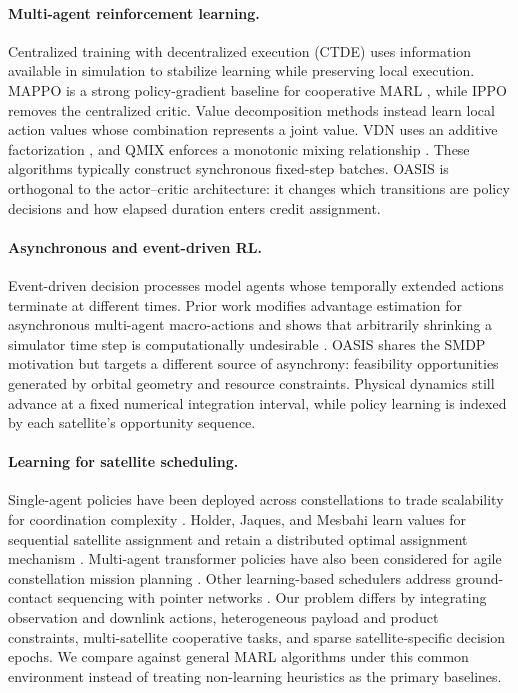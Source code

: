 \documentclass[letterpaper]{article}
\begin{document}
\paragraph{Multi-agent reinforcement learning.}
Centralized training with decentralized execution (CTDE) uses information available in simulation to stabilize learning while preserving local execution.  MAPPO is a strong policy-gradient baseline for cooperative MARL \cite{yu2022mappo}, while IPPO removes the centralized critic.  Value decomposition methods instead learn local action values whose combination represents a joint value.  VDN uses an additive factorization \cite{sunehag2018vdn}, and QMIX enforces a monotonic mixing relationship \cite{rashid2018qmix}.  These algorithms typically construct synchronous fixed-step batches.  OASIS is orthogonal to the actor--critic architecture: it changes which transitions are policy decisions and how elapsed duration enters credit assignment.

\paragraph{Asynchronous and event-driven RL.}
Event-driven decision processes model agents whose temporally extended actions terminate at different times.  Prior work modifies advantage estimation for asynchronous multi-agent macro-actions and shows that arbitrarily shrinking a simulator time step is computationally undesirable \cite{menda2019event}.  OASIS shares the SMDP motivation but targets a different source of asynchrony: feasibility opportunities generated by orbital geometry and resource constraints.  Physical dynamics still advance at a fixed numerical integration interval, while policy learning is indexed by each satellite's opportunity sequence.

\paragraph{Learning for satellite scheduling.}
Single-agent policies have been deployed across constellations to trade scalability for coordination complexity \cite{herrmann2024single}.  Holder, Jaques, and Mesbahi learn values for sequential satellite assignment and retain a distributed optimal assignment mechanism \cite{holder2025satellite}.  Multi-agent transformer policies have also been considered for agile constellation mission planning \cite{he2025transformer}.  Other learning-based schedulers address ground-contact sequencing with pointer networks \cite{dobariya2026pointer}.  Our problem differs by integrating observation and downlink actions, heterogeneous payload and product constraints, multi-satellite cooperative tasks, and sparse satellite-specific decision epochs.  We compare against general MARL algorithms under this common environment instead of treating non-learning heuristics as the primary baselines.
\end{document}
